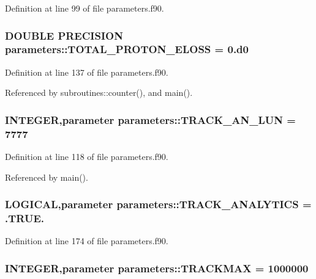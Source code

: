Definition at line 99 of file parameters.f90.\hypertarget{namespaceparameters_a575bcb79f78ecdcf97d1d21a582128ae}{
\subsubsection[{TOTAL\_\-PROTON\_\-ELOSS}]{\setlength{\rightskip}{0pt plus 5cm}DOUBLE PRECISION {\bf parameters::TOTAL\_\-PROTON\_\-ELOSS} = 0.d0}}
\label{namespaceparameters_a575bcb79f78ecdcf97d1d21a582128ae}


Definition at line 137 of file parameters.f90.

Referenced by subroutines::counter(), and main().\hypertarget{namespaceparameters_a4146bd3a7b3738c3b8f262e51969231b}{
\subsubsection[{TRACK\_\-AN\_\-LUN}]{\setlength{\rightskip}{0pt plus 5cm}INTEGER,parameter {\bf parameters::TRACK\_\-AN\_\-LUN} = 7777}}
\label{namespaceparameters_a4146bd3a7b3738c3b8f262e51969231b}


Definition at line 118 of file parameters.f90.

Referenced by main().\hypertarget{namespaceparameters_ad4575bbb41153e584b501a6238bd4b6c}{
\subsubsection[{TRACK\_\-ANALYTICS}]{\setlength{\rightskip}{0pt plus 5cm}LOGICAL,parameter {\bf parameters::TRACK\_\-ANALYTICS} = .TRUE.}}
\label{namespaceparameters_ad4575bbb41153e584b501a6238bd4b6c}


Definition at line 174 of file parameters.f90.\hypertarget{namespaceparameters_a8ec43c843ac10d7b08208da5c534f70a}{
\subsubsection[{TRACKMAX}]{\setlength{\rightskip}{0pt plus 5cm}INTEGER,parameter {\bf parameters::TRACKMAX} = 1000000}}
\label{namespaceparameters_a8ec43c843ac10d7b08208da5c534f70a}


